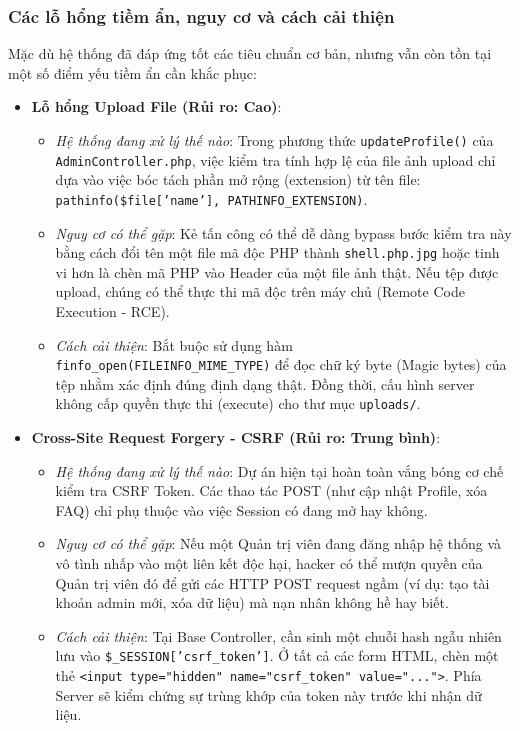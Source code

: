 \documentclass[pt = 12,a4paper]{article}
\begin{document}
\subsubsection{Các lỗ hổng tiềm ẩn, nguy cơ và cách cải thiện}
Mặc dù hệ thống đã đáp ứng tốt các tiêu chuẩn cơ bản, nhưng vẫn còn tồn tại một số điểm yếu tiềm ẩn cần khắc phục:

\begin{itemize}
    \item \textbf{Lỗ hổng Upload File (Rủi ro: Cao)}:
    \begin{itemize}
        \item \textit{Hệ thống đang xử lý thế nào}: Trong phương thức \texttt{updateProfile()} của \texttt{AdminController.php}, việc kiểm tra tính hợp lệ của file ảnh upload chỉ dựa vào việc bóc tách phần mở rộng (extension) từ tên file: \texttt{pathinfo(\$file['name'], PATHINFO\_EXTENSION)}.
        \item \textit{Nguy cơ có thể gặp}: Kẻ tấn công có thể dễ dàng bypass bước kiểm tra này bằng cách đổi tên một file mã độc PHP thành \texttt{shell.php.jpg} hoặc tinh vi hơn là chèn mã PHP vào Header của một file ảnh thật. Nếu tệp được upload, chúng có thể thực thi mã độc trên máy chủ (Remote Code Execution - RCE).
        \item \textit{Cách cải thiện}: Bắt buộc sử dụng hàm \texttt{finfo\_open(FILEINFO\_MIME\_TYPE)} để đọc chữ ký byte (Magic bytes) của tệp nhằm xác định đúng định dạng thật. Đồng thời, cấu hình server không cấp quyền thực thi (execute) cho thư mục \texttt{uploads/}.
    \end{itemize}

    \item \textbf{Cross-Site Request Forgery - CSRF (Rủi ro: Trung bình)}:
    \begin{itemize}
        \item \textit{Hệ thống đang xử lý thế nào}: Dự án hiện tại hoàn toàn vắng bóng cơ chế kiểm tra CSRF Token. Các thao tác POST (như cập nhật Profile, xóa FAQ) chỉ phụ thuộc vào việc Session có đang mở hay không.
        \item \textit{Nguy cơ có thể gặp}: Nếu một Quản trị viên đang đăng nhập hệ thống và vô tình nhấp vào một liên kết độc hại, hacker có thể mượn quyền của Quản trị viên đó để gửi các HTTP POST request ngầm (ví dụ: tạo tài khoản admin mới, xóa dữ liệu) mà nạn nhân không hề hay biết.
        \item \textit{Cách cải thiện}: Tại Base Controller, cần sinh một chuỗi hash ngẫu nhiên lưu vào \texttt{\$\_SESSION['csrf\_token']}. Ở tất cả các form HTML, chèn một thẻ \texttt{<input type="hidden" name="csrf\_token" value="...">}. Phía Server sẽ kiểm chứng sự trùng khớp của token này trước khi nhận dữ liệu.
    \end{itemize}


\end{itemize}
\end{document}

